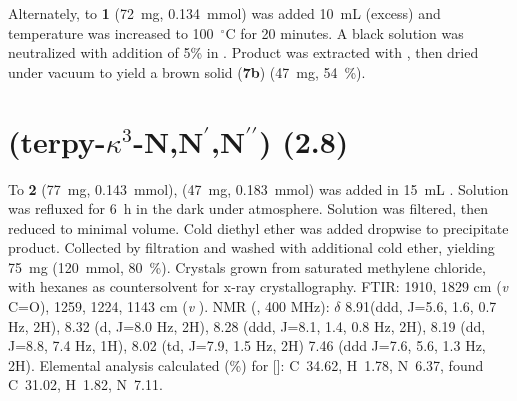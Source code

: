 Alternately, to \textbf{1} (72~mg, 0.134~mmol) was added 10~mL  (excess) and temperature was increased to 100~$^\circ$C for 20 minutes. A black solution was neutralized with addition of 5\%  in . Product was extracted with , then dried under vacuum to yield a brown solid (\textbf{7b}) (47~mg, 54~\%).

\section{(terpy-$\kappa^3$-N,N$^\prime$,N$^{\prime \prime}$) (2.8)}\label{sec.c8}
To \textbf{2} (77~mg,  0.143~mmol),  (47~mg,  0.183~mmol) was added in 15~mL . Solution was refluxed for 6~h in the dark under  atmosphere. Solution was filtered, then reduced to minimal volume. Cold diethyl ether was added dropwise to precipitate product. Collected by filtration and washed with additional cold ether, yielding 75~mg (120~mmol, 80~\%).  Crystals grown from saturated methylene chloride, with hexanes as countersolvent for x-ray crystallography. FTIR: 1910, 1829 cm (\textit{v} C=O), 1259, 1224, 1143 cm (\textit{v} ).  NMR (, 400 MHz): $\delta$ 8.91(ddd, J=5.6, 1.6, 0.7 Hz, 2H), 8.32 (d, J=8.0 Hz, 2H), 8.28 (ddd, J=8.1, 1.4, 0.8 Hz, 2H), 8.19 (dd, J=8.8, 7.4 Hz, 1H), 8.02 (td, J=7.9, 1.5 Hz, 2H) 7.46 (ddd J=7.6, 5.6, 1.3 Hz, 2H).  Elemental analysis calculated (\%) for []: C~34.62, H~1.78, N~6.37, found C~31.02, H~1.82, N~7.11.


